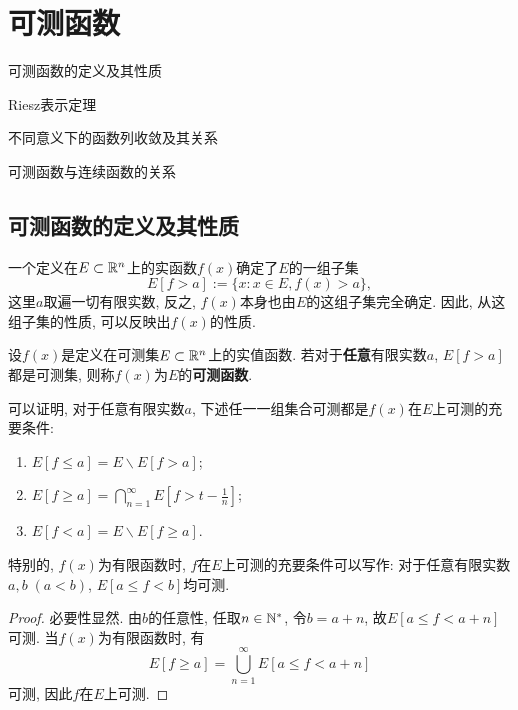 \chapter{可测函数}

\begin{introduction}
	\item 可测函数的定义及其性质
	\item Riesz表示定理
	\item 不同意义下的函数列收敛及其关系
	\item 可测函数与连续函数的关系
\end{introduction}
%
%

\section{可测函数的定义及其性质}


一个定义在$E \subset \mathbb{R}^n$上的实函数$f(x)$确定了$E$的一组子集
\begin{equation}
	E[f > a] := \{x:  x \in E , f(x) > a \},
\end{equation}
这里$a$取遍一切有限实数, 反之, $f(x)$本身也由$E$的这组子集完全确定. 
因此, 从这组子集的性质, 可以反映出$f(x)$的性质. 

\begin{definition}[可测函数]
	设$f(x)$是定义在可测集$E \subset \mathbb{R}^n$上的实值函数. 若对于\textbf{任意}有限实数$a$, $E[f>a]$都是可测集, 则称$f(x)$为$E$的\textbf{可测函数}.  
\end{definition}

可以证明, 对于任意有限实数$a$, 下述任一一组集合可测都是$f(x)$在$E$上可测的充要条件:
\begin{enumerate}
	\item $E[f \leq a] = E \backslash E[f>a]$; 
	\item $E[f \geq a] = \bigcap_{n=1}^{\infty} E \left[f > t-\frac 1n \right]$; 
	\item $E[f < a] = E \backslash E[f \geq a]$. 
\end{enumerate}

特别的, $f(x)$为有限函数时, $f$在$E$上可测的充要条件可以写作: 对于任意有限实数$a,b \; (a<b)$, $E[a \leq f < b]$均可测. 
\begin{proof}
	必要性显然. 
	由$b$的任意性, 任取$n \in \mathbb{N}^*$, 令$b = a+n$, 
	故$E[a \leq f < a+n]$可测. 
	当$f(x)$为有限函数时, 有
	$$
		E[f \geq a] = \bigcup\limits_{n = 1}^{\infty} E[a \leq f < a+n]
	$$
	可测, 因此$f$在$E$上可测. 
\end{proof}

